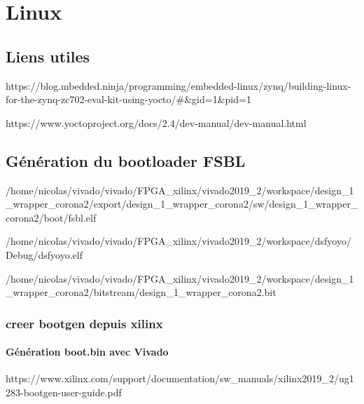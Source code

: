 \newpage

\chapter{Linux}



\section{Liens utiles}

https://blog.mbedded.ninja/programming/embedded-linux/zynq/building-linux-for-the-zynq-zc702-eval-kit-using-yocto/#&gid=1&pid=1

https://www.yoctoproject.org/docs/2.4/dev-manual/dev-manual.html

\section{Génération du bootloader FSBL}



/home/nicolas/vivado/vivado/FPGA_xilinx/vivado2019_2/workspace/design_1_wrapper_corona2/export/design_1_wrapper_corona2/sw/design_1_wrapper_corona2/boot/fsbl.elf

/home/nicolas/vivado/vivado/FPGA_xilinx/vivado2019_2/workspace/dsfyoyo/Debug/dsfyoyo.elf

/home/nicolas/vivado/vivado/FPGA_xilinx/vivado2019_2/workspace/design_1_wrapper_corona2/bitstream/design_1_wrapper_corona2.bit



\subsection{creer bootgen depuis xilinx}

\subsubsection{Génération boot.bin avec Vivado}

https://www.xilinx.com/support/documentation/sw_manuals/xilinx2019_2/ug1283-bootgen-user-guide.pdf

\\


